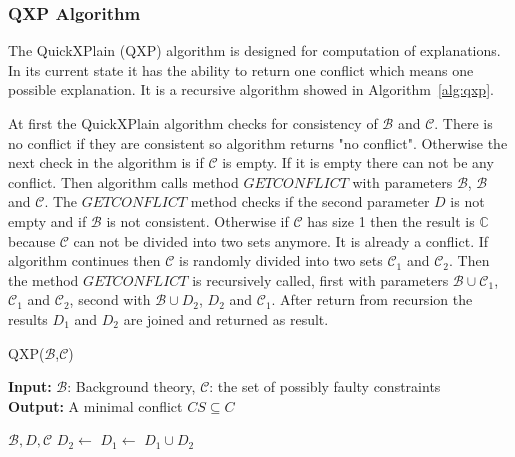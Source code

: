 \documentclass[12pt,a4paper]{article}
\begin{document}
\subsubsection{QXP Algorithm}

The QuickXPlain (QXP) algorithm is designed for computation of explanations. In its current state it has the ability to return one conflict which means one possible explanation. It is a recursive algorithm showed in Algorithm~\ref{alg:qxp}.

At first the QuickXPlain algorithm checks for consistency of $\mathcal{B}$ and $\mathcal{C}$. There is no conflict if they are consistent so algorithm returns "no conflict". Otherwise the next check in the algorithm is if $\mathcal{C}$ is empty. If it is empty there can not be any conflict. Then algorithm calls method $\mathit{GETCONFLICT}$ with parameters $\mathcal{B}$, $\mathcal{B}$ and $\mathcal{C}$. The $\mathit{GETCONFLICT}$ method checks if the second parameter $D$ is not empty and if $\mathcal{B}$ is not consistent. Otherwise if $\mathcal{C}$ has size 1 then the result is $\mathbb{C}$ because $\mathcal{C}$ can not be divided into two sets anymore. It is already a conflict. If algorithm continues then $\mathcal{C}$ is randomly divided into two sets $\mathcal{C}_{1}$ and $\mathcal{C}_{2}$. Then the method $\mathit{GETCONFLICT}$ is recursively called, first with parameters $\mathcal{B} \cup \mathcal{C}_{1}$, $\mathcal{C}_{1}$ and $\mathcal{C_{2}}$, second with $\mathcal{B} \cup D_{2}$, $D_{2}$ and $\mathcal{C}_{1}$. After return from recursion the results $D_{1}$ and $D_{2}$ are joined and returned as result.

\begin{algorithm}[H]
	\footnotesize
	\caption{QXP($\mathcal{B}$,$\mathcal{C}$)}
	\label{alg:qxp}
	\textbf{Input:} $\mathcal{B}$: Background theory, $\mathcal{C}$: the set of possibly faulty constraints  \\
	\textbf{Output:} A minimal conflict $CS \subseteq C$
	\begin{algorithmic}[1]
		\State {}
		\State \Return {$\emptyset$}
		\EndIf
		\State {}
		
		\medskip
		 {$\mathcal{B}, D, \mathcal{C}$}
		\State \Return {$\emptyset$}
		\EndIf
		\State {}
		\EndIf
		\State $D_{2} \gets$ 
		\State $D_{1} \gets$ 
		\State \Return $D_{1} \cup D_{2}$
		\EndFunction			
	\end{algorithmic}
\end{algorithm}
\end{document}
